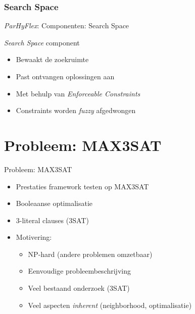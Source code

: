 \documentclass[handout]{beamer}
\newcommand{\parhyflexmech}{\node[draw=white,rectangle,minimum width=8 cm, minimum height=5 cm,fill=blue!20] (Machine) at (0,0) {};
\draw[black] ($(Machine.east)+(0,0.3)$) -- (Machine.north east) -| (Machine.south west) -| ($(Machine.east)+(0,-0.3)$);
\coordinate (OC) at (Machine.east);
\draw[dashed,->] (OC) to node[above,sloped]{\tiny World} ++(1,0);
\node[draw,rectangle,fill=gray!20,minimum width=4 cm, minimum height=0.5cm] (EXC) at (-1.8,2.05) {Execution Mechanism};
\node[draw,rectangle,fill=gray!20,minimum width=1 cm, minimum height=1cm] (EXP) at (3,1.8) {\tiny{Experience}};
\draw[orange,->] (EXC.east) to node[above]{\tiny Amnesia} (EXP.west |- EXC.east);
\node[draw,rectangle,fill=gray!20,minimum width=1 cm, minimum height=1cm] (NGT) at (3,-1.8) {\tiny{Negotiator}};
\draw[red,->] (EXP) to node[above,sloped]{\tiny Constraints} (NGT);
\draw[dashed,<-] (NGT.east) .. controls ($(NGT.east)+(1,0)$) and ($(OC)+(-1,0)$) .. (OC);
\node[draw,rectangle,fill=gray!20,minimum width=1 cm, minimum height=1cm] (SSP) at (0,-1.8) {\tiny{Search Space}};
\draw[red,->] (NGT) to node[above,sloped]{\tiny Constraints} (SSP);
\node[draw,dashed,rectangle,fill=gray!20,minimum width=0.5 cm, minimum height=0.5cm] (STA) at (1.5,1) {\tiny{State}};
\draw[dashed,<-] (STA.east) .. controls ($(STA.east)+(1,0)$) and ($(OC)+(-1,0)$) .. (OC);

\begin{scope}[xshift=-1.8 cm,yshift=0.55cm]
\node[draw,rectangle,fill=gray!20,minimum width=4 cm, minimum height=0.5cm] (MEM) at (0,0) {};
\foreach\x in {0,1,...,6} {
  \draw (0.5*\x-1.5,-0.25) -- ++(0,0.5);
}
\foreach\x in {2,...,7} {
  \draw[dotted,red!50!black] (MEM.south -| 0.5*\x-1.75,0) -- (SSP);
}
\foreach\x in {0,1} {
  \draw (0.5*\x-1.75,0) node {$s_{\x}$};
  \draw[<->] (MEM.north -| 0.5*\x-1.75,0) to node[sloped,above]{\tiny r/w} (EXC.south -| 0.5*\x-1.75,0);
  \draw[dashed] (MEM.south -| 0.5*\x-1.75,0) .. controls (0.5*\x-1.75,0.125*\x-1.75) and ($(OC)+(-3,0)$) .. (OC);
  \draw[->] (MEM.north -| 0.5*\x-1.625,0) .. controls (0.5*\x-1.625,-0.125*\x+0.75) and ($0.5*(EXP.west)+0.5*(EXP.south west)+(-3,0)$) .. ($0.5*(EXP.west)+0.5*(EXP.south west)$);
}
\foreach\x in {2,3} {
  \draw (0.5*\x-1.75,0) node {$s_{\x}$};
  \draw[->] (MEM.north -| 0.5*\x-1.75,0) to node[sloped,above]{\tiny read} (EXC.south -| 0.5*\x-1.75,0);
  \draw[<-,dashed] (MEM.south -| 0.5*\x-1.75,0) .. controls (0.5*\x-1.75,0.125*\x-1.75) and ($(OC)+(-3,0)$) .. (OC);
  \draw (0.5*\x-2,-0.25) -- ++(0.5,0.5);
}
\foreach\x in {4,5} {
  \draw (0.5*\x-1.75,0) node {$s_{\x}$};
  \draw[->] (MEM.north -| 0.5*\x-1.75,0) to node[sloped,above]{\tiny read} (EXC.south -| 0.5*\x-1.75,0);
  \draw[<-,dashed] (MEM.south -| 0.5*\x-1.75,0) .. controls (0.5*\x-1.75,0.125*\x-1.75) and ($(OC)+(-3,0)$) .. (OC);
  \draw (0.5*\x-2,0.25) -- ++(0.5,-0.5);
}
\foreach\x in {6,7} {
  \draw (0.5*\x-1.75,0) node {$s_{\x}$};
  \draw[->] (MEM.north -| 0.5*\x-1.75,0) to node[sloped,above]{\tiny read} (EXC.south -| 0.5*\x-1.75,0);
  \draw[<-,dashed] (MEM.south -| 0.5*\x-1.75,0) .. controls (0.5*\x-1.75,0.125*\x-1.75) and ($(OC)+(-3,0)$) .. (OC);
  \draw (0.5*\x-2,-0.25) -- ++(0.5,0.5);
  \draw (0.5*\x-2,0.25) -- ++(0.5,-0.5);
}
\end{scope}}
\begin{document}
\subsubsection{Search Space}
\begin{frame}{\emph{ParHyFlex}: Componenten: Search Space}
\begin{block}{\emph{Search Space} component}
\begin{itemize}[<+->]
 \item Bewaakt de zoekruimte
 \item Past ontvangen oplossingen aan
 \item Met behulp van \emph{Enforceable Constraints}
 \item Constraints worden \emph{fuzzy} afgedwongen
\end{itemize}
\end{block}
\begin{figure}
\end{figure}
\end{frame}
\section{Probleem: MAX3SAT}
\begin{frame}{Probleem: MAX3SAT}
\begin{itemize}[<+->]
 \item Prestaties framework testen op MAX3SAT
 \item Booleaanse optimalisatie
 \item 3-literal clauses (3SAT)
 \item Motivering:
 \begin{itemize}[<+->]
  \item NP-hard (andere problemen omzetbaar)
  \item Eenvoudige probleembeschrijving
  \item Veel bestaand onderzoek (3SAT)
  \item Veel aspecten \emph{inherent} (neighborhood, optimalisatie)
 \end{itemize}
\end{itemize}
\end{frame}
\end{document}
